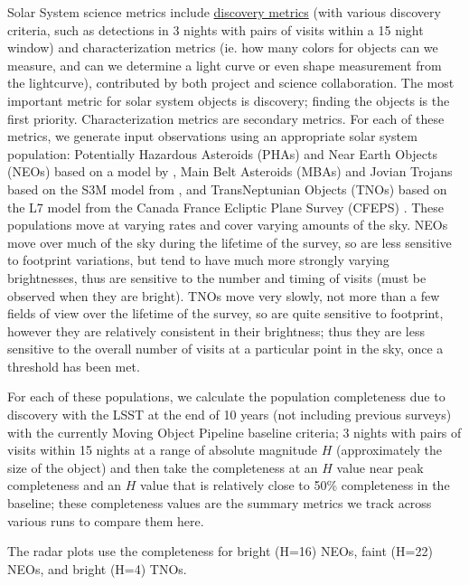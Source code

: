 Solar System science metrics include \href{https://github.com/lsst/sims_maf/blob/master/python/lsst/sims/maf/metrics/moMetrics.py#L215}{discovery metrics} (with various discovery criteria, such as detections in 3 nights with pairs of visits within a 15 night window) and characterization metrics (ie. how many colors for objects can we measure, and can we determine a light curve or even shape measurement from the lightcurve), contributed by both project and science collaboration. The most important metric for solar system objects is discovery; finding the objects is the first priority. Characterization metrics are secondary metrics. For each of these metrics, we generate input observations using an appropriate solar system population: Potentially Hazardous Asteroids (PHAs) and Near Earth Objects (NEOs) based on a model by \citet{2018Icar..312..181G}, Main Belt Asteroids (MBAs) and Jovian Trojans based on the S3M model from \citet{2011PASP..123..423G}, and TransNeptunian Objects (TNOs) based on the L7 model from the Canada France Ecliptic Plane Survey (CFEPS) \citep{2009AJ....137.4917K, 2011AJ....142..131P}. These populations move at varying rates and cover varying amounts of the sky. NEOs move over much of the sky during the lifetime of the survey, so are less sensitive to footprint variations, but tend to have much more strongly varying brightnesses, thus are sensitive to the number and timing of visits (must be observed when they are bright). TNOs move very slowly, not more than a few fields of view over the lifetime of the survey, so are quite sensitive to footprint, however they are relatively consistent in their brightness; thus they are less sensitive to the overall number of visits at a particular point in the sky, once a threshold has been met. 

For each of these populations, we calculate the population completeness due to discovery with the LSST at the end of 10 years (not including previous surveys) with the currently Moving Object Pipeline baseline criteria; 3 nights with pairs of visits within 15 nights at a range of absolute magnitude $H$ (approximately the size of the object) and then take the completeness at an $H$ value near peak completeness and an $H$ value that is relatively close to 50\% completeness in the baseline; these completeness values are the summary metrics we track across various runs to compare them here. 

The radar plots use the completeness for bright (H=16) NEOs, faint (H=22) NEOs, and bright (H=4) TNOs. 

